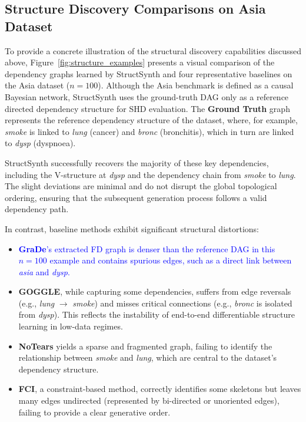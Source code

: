 \subsection{Structure Discovery Comparisons on Asia Dataset}
\label{app:structure_examples}
To provide a concrete illustration of the structural discovery capabilities discussed above, Figure~\ref{fig:structure_examples} presents a visual comparison of the dependency graphs learned by \textsf{StructSynth} and four representative baselines on the Asia dataset ($n=100$). Although the Asia benchmark is defined as a causal Bayesian network, StructSynth uses the ground-truth DAG only as a reference directed dependency structure for SHD evaluation. The \textbf{Ground Truth} graph represents the reference dependency structure of the dataset, where, for example, \textit{smoke} is linked to \textit{lung} (cancer) and \textit{bronc} (bronchitis), which in turn are linked to \textit{dysp} (dyspnoea).

\textsf{StructSynth} successfully recovers the majority of these key dependencies, including the V-structure at \textit{dysp} and the dependency chain from \textit{smoke} to \textit{lung}. The slight deviations are minimal and do not disrupt the global topological ordering, ensuring that the subsequent generation process follows a valid dependency path.

In contrast, baseline methods exhibit significant structural distortions:
\begin{itemize}[leftmargin=*]
    \item \textcolor{blue}{\textbf{GraDe}'s extracted FD graph is denser than the reference DAG in this $n=100$ example and contains spurious edges, such as a direct link between \textit{asia} and \textit{dysp}.}
    \item \textbf{GOGGLE}, while capturing some dependencies, suffers from edge reversals (e.g., \textit{lung} $\rightarrow$ \textit{smoke}) and misses critical connections (e.g., \textit{bronc} is isolated from \textit{dysp}). This reflects the instability of end-to-end differentiable structure learning in low-data regimes.
    \item \textbf{NoTears} yields a sparse and fragmented graph, failing to identify the relationship between \textit{smoke} and \textit{lung}, which are central to the dataset's dependency structure.
    \item \textbf{FCI}, a constraint-based method, correctly identifies some skeletons but leaves many edges undirected (represented by bi-directed or unoriented edges), failing to provide a clear generative order.
\end{itemize}


